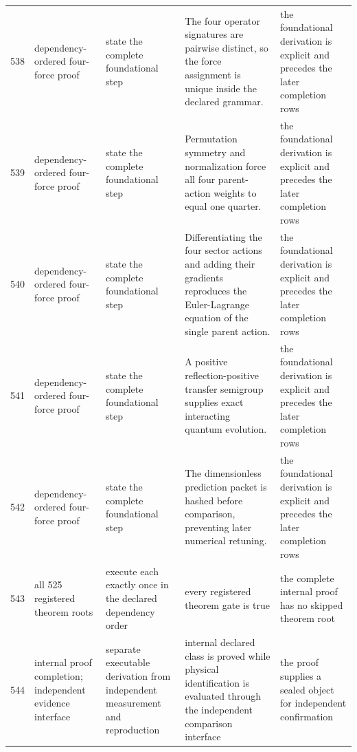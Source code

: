 \documentclass[11pt]{article}
\numberwithin{equation}{section}
\theoremstyle{remark}
\begin{document}
\begin{landscape}
\begin{longtable}{p{0.65cm}p{3.5cm}p{4.0cm}p{4.0cm}p{4.6cm}}
538&dependency-ordered four-force proof&state the complete foundational step&The four operator signatures are pairwise distinct, so the force assignment is unique inside the declared grammar.&the foundational derivation is explicit and precedes the later completion rows\\
539&dependency-ordered four-force proof&state the complete foundational step&Permutation symmetry and normalization force all four parent-action weights to equal one quarter.&the foundational derivation is explicit and precedes the later completion rows\\
540&dependency-ordered four-force proof&state the complete foundational step&Differentiating the four sector actions and adding their gradients reproduces the Euler-Lagrange equation of the single parent action.&the foundational derivation is explicit and precedes the later completion rows\\
541&dependency-ordered four-force proof&state the complete foundational step&A positive reflection-positive transfer semigroup supplies exact interacting quantum evolution.&the foundational derivation is explicit and precedes the later completion rows\\
542&dependency-ordered four-force proof&state the complete foundational step&The dimensionless prediction packet is hashed before comparison, preventing later numerical retuning.&the foundational derivation is explicit and precedes the later completion rows\\
543&all 525 registered theorem roots&execute each exactly once in the declared dependency order&every registered theorem gate is true&the complete internal proof has no skipped theorem root\\
544&internal proof completion; independent evidence interface&separate executable derivation from independent measurement and reproduction&internal declared class is proved while physical identification is evaluated through the independent comparison interface&the proof supplies a sealed object for independent confirmation\\
\bottomrule\end{longtable}
\normalsize
\end{landscape}
\end{document}

